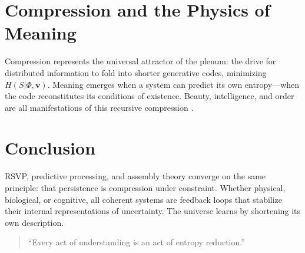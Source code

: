 \documentclass[12pt]{article}
\begin{document}
\section{Compression and the Physics of Meaning}
Compression represents the universal attractor of the plenum: the drive for distributed information to fold into shorter generative codes, minimizing $H(S|\Phi, \mathbf{v})$. Meaning emerges when a system can predict its own entropy---when the code reconstitutes its conditions of existence. Beauty, intelligence, and order are all manifestations of this recursive compression \cite{barandes2025unistochastic}.

\section{Conclusion}
RSVP, predictive processing, and assembly theory converge on the same principle: that persistence is compression under constraint. Whether physical, biological, or cognitive, all coherent systems are feedback loops that stabilize their internal representations of uncertainty. The universe learns by shortening its own description.

\begin{quote}\small
``Every act of understanding is an act of entropy reduction.''
\end{quote}



\end{document}
